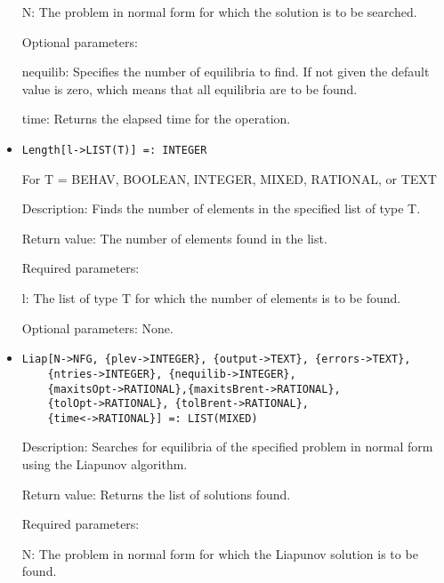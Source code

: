 \begin{itemize}
\bd
\item
[ N:] The problem in normal form for which the solution is to be 
searched.
\ed

\item
[Optional parameters:]\hfil\null

\bd
\item
[ nequilib:] Specifies the number of equilibria to find.  If not
given the default value is zero, which means that all 
equilibria are to be found.
\item
[ time:] Returns the elapsed time for the operation.
\ed
\ed

\item
\protect \large \begin{verbatim}
Length[l->LIST(T)] =: INTEGER
\end{verbatim}\normalsize
	For T = BEHAV, BOOLEAN, INTEGER, MIXED, RATIONAL, or TEXT

\bd
\item
[Description:] Finds the number of elements in the specified list of 
type T.
\item
[Return value:] The number of elements found in the list.
\item
[Required parameters:]\hfil\null

\bd
\item
[ l:] The list of type T for which the number of elements is to be found.
\ed

\item
[Optional parameters:] None.
\ed

\item
\protect \large \begin{verbatim}
Liap[N->NFG, {plev->INTEGER}, {output->TEXT}, {errors->TEXT}, 
	{ntries->INTEGER}, {nequilib->INTEGER}, 
	{maxitsOpt->RATIONAL},{maxitsBrent->RATIONAL}, 
	{tolOpt->RATIONAL}, {tolBrent->RATIONAL}, 
	{time<->RATIONAL}] =: LIST(MIXED)
\end{verbatim}\normalsize

\bd
\item
[Description:] Searches for equilibria of the specified problem in 
normal form using the Liapunov algorithm.
\item
[Return value:] Returns the list of solutions found.
\item
[Required parameters:]\hfil\null

\bd
\item
[ N:] The problem in normal form for which the Liapunov solution is 
to be found.
\ed


\end{itemize}
